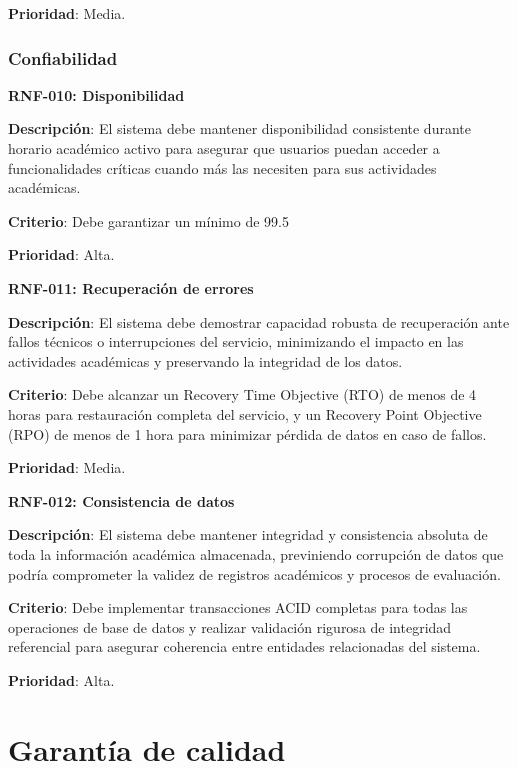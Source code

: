 \documentclass[12pt,a4paper,oneside]{report}
\begin{document}
\textbf{Prioridad}: Media.

\subsubsection{Confiabilidad}\label{confiabilidad}

\textbf{RNF-010: Disponibilidad}

\textbf{Descripción}: El sistema debe mantener disponibilidad consistente durante horario académico activo para asegurar que usuarios puedan acceder a funcionalidades críticas cuando más las necesiten para sus actividades académicas.

\textbf{Criterio}: Debe garantizar un mínimo de 99.5%

\textbf{Prioridad}: Alta.

\textbf{RNF-011: Recuperación de errores}

\textbf{Descripción}: El sistema debe demostrar capacidad robusta de recuperación ante fallos técnicos o interrupciones del servicio, minimizando el impacto en las actividades académicas y preservando la integridad de los datos.

\textbf{Criterio}: Debe alcanzar un Recovery Time Objective (RTO) de menos de 4 horas para restauración completa del servicio, y un Recovery Point Objective (RPO) de menos de 1 hora para minimizar pérdida de datos en caso de fallos.

\textbf{Prioridad}: Media.

\textbf{RNF-012: Consistencia de datos}

\textbf{Descripción}: El sistema debe mantener integridad y consistencia absoluta de toda la información académica almacenada, previniendo corrupción de datos que podría comprometer la validez de registros académicos y procesos de evaluación.

\textbf{Criterio}: Debe implementar transacciones ACID completas para todas las operaciones de base de datos y realizar validación rigurosa de integridad referencial para asegurar coherencia entre entidades relacionadas del sistema.

\textbf{Prioridad}: Alta.

\section{Garantía de calidad}\label{garantuxeda-de-calidad}
\end{document}
